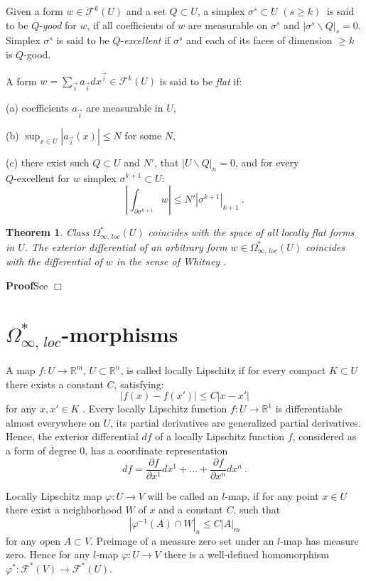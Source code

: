 \documentclass{amsart}%
\newtheorem{thm}{Theorem}[section]
\newcommand{\Rn}{\mathbb{R}^{n}}
\begin{document}
Given a form $w\in\mathcal{F}^{k}(U)$ and a set $Q\subset U$, a
simplex $\sigma^s\subset U$ $(s\geq k)\ $ is said to be
$Q$-\emph{good} for $w$, if all coefficients of $w$ are measurable
on $\sigma^s$ and $|\sigma^s\backslash Q|_s=0$. Simplex $\sigma^s$
is said to be $Q$-\emph{excellent} if $\sigma^s$ and each of its
faces of dimension $\geq k$ is $Q$-good.

A form $w=\displaystyle{\sum_{\vec{i}}a_{\vec{i}}dx^{\vec{i}}}\in
\mathcal{F}^{k}(U)$ is said to be \emph{flat} if:

(a) coefficients $a_{\vec{i}}$ are measurable in $U$,

(b) $\displaystyle{\sup_{x\in U}|a_{\vec{i}}(x)|\leq N}$ for some
$N$,

(c) there exist such $Q\subset U$ and $N'$, that $|U\backslash
Q|_n=0$, and for every\\ $Q$-excellent for $w$ simplex
$\sigma^{k+1}\subset U$: $$|\int_{\partial \sigma^{k+1}}w|\leq
N'|\sigma^{k+1}|_{k+1}\ .$$
\begin{thm}
\label{thm:1.5} Class $\Omega^{*}_{\infty,\,loc}(U)$ coincides
with the space of all locally flat forms in $U$. The exterior
differential of an arbitrary form $w\in
\Omega^{*}_{\infty,\,loc}(U)$ coincides with the differential of
$w$ in the sense of Whitney \cite[IX.12]{W}.
\end{thm}
{\bf Proof}\quad See \cite[Theorem 1.5]{GKS} $\Box$

\section{$\Omega^{*}_{\infty,\,loc}$-morphisms}
A map $f:U\rightarrow \mathbb{R}^{m}$, $U\subset \Rn$, is called
locally Lipschitz if for every compact $K \subset U$ there exists
a constant $C$, satisfying: $$|f(x)-f(x')|\leq C|x-x'|$$ for any
$x, x' \in K$ . Every locally Lipschitz function $f:U\rightarrow
\mathbb{R}^{1}$ is differentiable almost everywhere on $U$, its
partial derivatives are generalized partial derivatives. Hence,
the exterior differential $df$ of a locally Lipschitz function
$f$, considered as a form of degree $0$, has a coordinate
representation $$df=\frac{\partial f}{\partial
x^1}dx^1+...+\frac{\partial f}{\partial x^n}dx^n\ .$$

Locally Lipschitz map $\varphi: U\rightarrow V$ will be called an
$l$-map, if for any point $x\in U$ there exist a neighborhood $W$
of $x$ and a constant $C$, such that $$|\varphi^{-1}(A)\cap
W|_n\leq C|A|_m$$ for any open $A\subset V$. Preimage of a measure
zero set under an $l$-map has measure zero. Hence for any $l$-map
$\varphi: U\rightarrow V$ there is a well-defined homomorphism
$\varphi^*: \mathcal{F}^*(V)\rightarrow \mathcal{F}^*(U)$.
\end{document}

